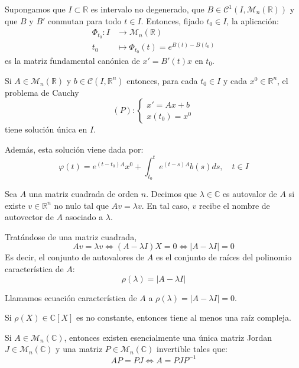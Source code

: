 \begin{theorem}
    Supongamos que $I \subset \mathbb{R}$ es intervalo no degenerado, que $B \in \mathcal{C}^1(I, \mathcal{M}_n(\mathbb{R}))$ y que $B$ y $B'$ conmutan para todo $t \in I$.
    Entonces, fijado $t_0 \in I$, la aplicación:
    \begin{align*}
        \Phi_{t_0}: I & \to \mathcal{M}_n(\mathbb{R})             \\
        t_0           & \mapsto \Phi_{t_0}(t) = e^{B(t) - B(t_0)}
    \end{align*}
    es la matriz fundamental canónica de $x' = B'(t)x$ en $t_0$.
\end{theorem}

\begin{corollary}
    Si $A \in \mathcal{M}_n(\mathbb{R})$ y $b \in \mathcal{C}(I, \mathbb{R}^n)$ entonces, para cada $t_0 \in I$ y cada $x^0 \in \mathbb{R}^n$, el problema de Cauchy
    $$(P): \begin{cases}
            x' = Ax + b \\
            x(t_0) = x^0
        \end{cases}$$
    tiene solución única en $I$.

    Además, esta solución viene dada por:
    $$\varphi(t) = e^{(t-t_0)A}x^0 + \int_{t_0}^t e^{(t-s)A}b(s)ds, \quad t \in I$$
\end{corollary}

\begin{definition}
    Sea $A$ una matriz cuadrada de orden $n$.
    Decimos que $\lambda \in \mathbb{C}$ es autovalor de $A$ si existe $v \in \mathbb{R}^n$ no nulo tal que $Av = \lambda v$.
    En tal caso, $v$ recibe el nombre de autovector de $A$ asociado a $\lambda$.

    Tratándose de una matriz cuadrada,
    $$Av = \lambda v \Leftrightarrow (A-\lambda I)X = 0 \Leftrightarrow |A-\lambda I| = 0$$
    Es decir, el conjunto de autovalores de $A$ es el conjunto de raíces del polinomio característica de $A$:
    $$\rho(\lambda) = |A - \lambda I|$$

    Llamamos ecuación característica de $A$ a $\rho(\lambda) = |A - \lambda I| = 0$.
\end{definition}

\begin{theorem}
    Si $\rho(X) \in \mathbb{C}[X]$ es no constante, entonces tiene al menos una raíz compleja.
\end{theorem}

\begin{theorem}
    Si $A \in \mathcal{M}_n(\mathbb{C})$, entonces existen esencialmente una única matriz Jordan $J \in \mathcal{M}_n(\mathbb{C})$ y una matriz $P \in \mathcal{M}_n(\mathbb{C})$ invertible tales que:
    $$AP = PJ \Leftrightarrow A = PJP^{-1}$$
\end{theorem}